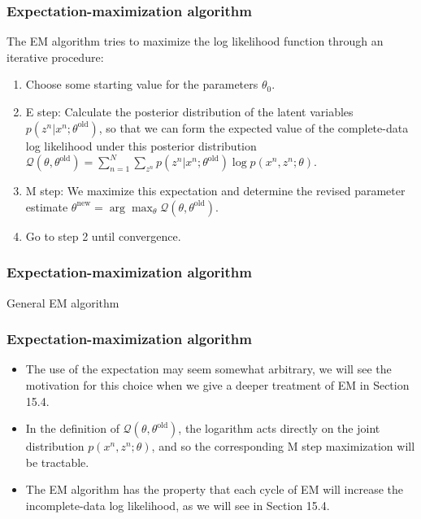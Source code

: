 \documentclass{beamer}
\begin{document}
\begin{frame}
    \frametitle{Expectation-maximization algorithm}
    The EM algorithm tries to maximize the log likelihood function through an iterative procedure:
    \begin{enumerate}
        \item Choose some starting value for the parameters $\theta_{0}$.
        \item E step: Calculate the posterior distribution of the latent variables $p(z^{n}|x^{n};\theta^{\textrm{old}})$, so that we can form the expected value of the complete-data log likelihood under this posterior distribution $\mathcal{Q}(\theta,\theta^{\textrm{old}})=\sum_{n=1}^{N}\sum_{z^{n}}p(z^{n}|x^{n};\theta^{\textrm{old}})\log{}p(x^{n},z^{n};\theta)$.
        \item M step: We maximize this expectation and determine the revised parameter estimate $\theta^{\textrm{new}}=\arg\max_{\theta}\mathcal{Q}(\theta,\theta^{\textrm{old}})$.
        \item Go to step 2 until convergence.
    \end{enumerate}
\end{frame}

\begin{frame}
    \frametitle{Expectation-maximization algorithm}
    \begin{algorithm}[H]
        \caption{General EM algorithm}
        \;
    \end{algorithm}
\end{frame}

\begin{frame}
    \frametitle{Expectation-maximization algorithm}
    \begin{itemize}
        \item The use of the expectation may seem somewhat arbitrary, we will see the motivation for this choice when we give a deeper treatment of EM in Section 15.4.
        \item In the definition of $\mathcal{Q}(\theta,\theta^{\textrm{old}})$, the logarithm acts directly on the joint distribution $p(x^{n},z^{n};\theta)$, and so the corresponding M step maximization will be tractable.
        \item The EM algorithm has the property that each cycle of EM will increase the incomplete-data log likelihood, as we will see in Section 15.4.
    \end{itemize}
\end{frame}
\end{document}
